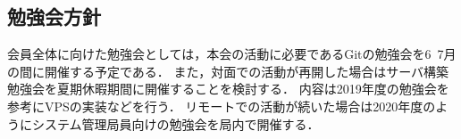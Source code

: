 \subsection*{勉強会方針}


会員全体に向けた勉強会としては，本会の活動に必要であるGitの勉強会を6~7月の間に開催する予定である．
また，対面での活動が再開した場合はサーバ構築勉強会を夏期休暇期間に開催することを検討する．
内容は2019年度の勉強会を参考にVPSの実装などを行う．
リモートでの活動が続いた場合は2020年度のようにシステム管理局員向けの勉強会を局内で開催する．


